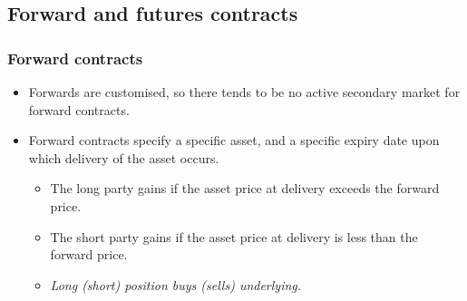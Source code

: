 \documentclass[../notes_compiled.tex]{subfiles}
\begin{document}
\begin{itemize}
\subsection{Forward and futures contracts}
\subsubsection{Forward contracts}
\begin{itemize}
\item Forwards are customised, so there tends to be no active secondary market for forward contracts.
\item Forward contracts specify a specific asset, and a specific expiry date upon which delivery of the asset occurs.
\begin{itemize}
\item The long party gains if the asset price at delivery exceeds the forward price.
\item The short party gains if the asset price at delivery is less than the forward price.
\item[] \emph{Long (short) position buys (sells) underlying.}
\end{itemize}


\end{itemize}
\end{itemize}
\end{document}
